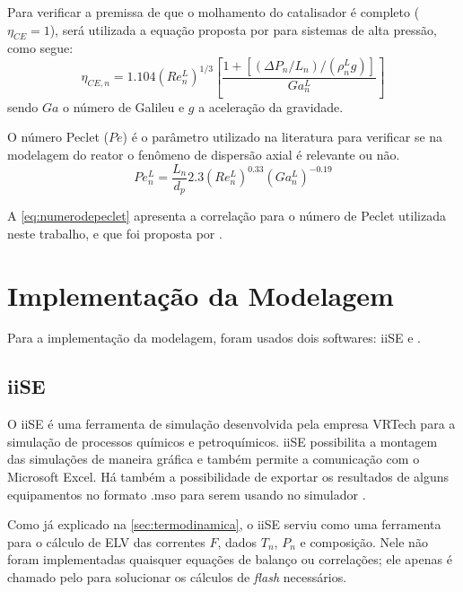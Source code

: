 
Para verificar a premissa de que o molhamento do catalisador é completo
($\eta_{CE} = 1$), será utilizada a equação proposta por
 para sistemas de alta pressão, como segue:
\begin{equation}
\eta_{CE,n} = \num{1,104}(Re_n^L)^{1/3} \left [
\dfrac{1 + [(\Delta P_n/L_{n})/(\rho_{n}^L g)]}{Ga_{n}^{L}} \right ]
\label{eq:molhamento}
\end{equation}
sendo $Ga$ o número de Galileu e $g$ a aceleração da gravidade.


O número Peclet ($Pe$) é o parâmetro utilizado na literatura para verificar
se na modelagem do reator o fenômeno de dispersão axial é relevante ou não.
\begin{equation}
Pe_n^L = \dfrac{L_n}{d_p}
\num{2,3}(Re_n^L)^{\num{0,33}}(Ga_{n}^{L})^{\num{-0,19}}
\label{eq:numerodepeclet}
\end{equation}

A \autoref{eq:numerodepeclet} apresenta a correlação para o número de
Peclet utilizada neste trabalho, e que foi proposta por
.


\section{Implementação da Modelagem} \label{sec:implementacao}

Para a implementação da modelagem, foram usados dois softwares: iiSE e \emso. 

\subsection{iiSE} \label{sec:iise}

O iiSE é uma ferramenta de simulação desenvolvida pela empresa VRTech para a
simulação de processos químicos e petroquímicos. iiSE possibilita a
montagem das simulações de maneira gráfica e também permite a comunicação
com o Microsoft Excel. Há também a possibilidade de exportar os resultados
de alguns equipamentos no formato .mso para serem usando no simulador \emso.

Como já explicado na \autoref{sec:termodinamica}, o iiSE serviu como uma
ferramenta para o cálculo de ELV das correntes $F$, dados $T_n$, $P_n$ e
composição. Nele não foram implementadas quaisquer equações de balanço ou
correlações; ele apenas é chamado pelo \emso para solucionar os cálculos de
\emph{flash} necessários.

